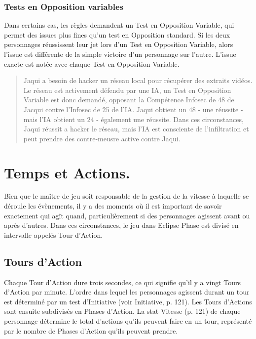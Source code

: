 \subsubsection{Tests en Opposition variables} \label{sec:vari-oppos-test} 

Dans certains cas, les règles demandent un Test en Opposition Variable, qui permet des issues plus fines qu'un test en Opposition standard. Si les deux personnages réussissent leur jet lors d'un Test en Opposition Variable, alors l'issue est différente de la simple victoire d'un personnage sur l'autre. L'issue exacte est notée avec chaque Test en Opposition Variable. 

\begin{quotation} Jaqui a besoin de hacker un réseau local pour récupérer des extraits vidéos. Le réseau est activement défendu par une IA, un Test en Opposition Variable est donc demandé, opposant la Compétence Infosec de 48 de Jacqui contre l'Infosec de 25 de l'IA. Jaqui obtient un 48 - une réussite - mais l'IA obtient un 24 - également une réussite. Dans ces circonstances, Jaqui réussit a hacker le réseau, mais l'IA est consciente de l'infiltration et peut prendre des contre-meusre active contre Jaqui. \end{quotation} 

\section{Temps et Actions.} \label{sec:time-actions} 

Bien que le maître de jeu soit responsable de la gestion de la vitesse à laquelle se déroule les évènements, il y a des moments où il est important de savoir exactement qui agît quand, particulièrement si des personnages agissent avant ou après d'autres. Dans ces circonstances, le jeu dans Eclipse Phase est divisé en intervalle appelés Tour d'Action. 

\subsection{Tours d'Action} \label{sec:action-turns} 

Chaque Tour d'Action dure trois secondes, ce qui signifie qu'il y a vingt Tours d'Action par minute. L'ordre dans lequel les personnages agissent durant un tour est déterminé par un test d'Initiative (voir Initiative, p. 121). Les Tours d'Actions sont ensuite subdivisés en Phases d'Action. La stat Vitesse (p. 121) de chaque personnage détermine le total d'actions qu'ils peuvent faire en un tour, représenté par le nombre de Phases d'Action qu'ils peuvent prendre. 

